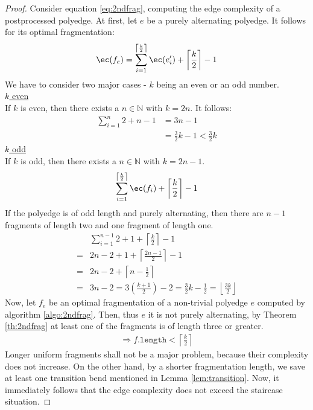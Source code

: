 \begin{proof}
	Consider equation \ref{eq:2ndfrag}, computing the edge complexity of a postprocessed polyedge. At first, let $e$ be a purely alternating polyedge. It follows for its optimal fragmentation:
	\begin{align*}
	\ec(f_e) = \sum_{i=1}^{\left\lceil\frac{k}{2}\right\rceil} \ec(e'_i) + \left\lceil\frac{k}{2}\right\rceil - 1
	\end{align*}
	We have to consider two major cases - $k$ being an even or an odd number.\\
	\underline{$k$ even}\\
	If $k$ is even, then there exists a $n \in \mathbb{N}$ with $k = 2n$. It follows:
	\begin{align*}
	\sum_{i=1}^{n} 2 + n - 1 &= 3n - 1\\
	&= \frac{3}{2}k - 1 < \frac{3}{2}k
	\end{align*}
	\underline{$k$ odd}\\
	If $k$ is odd, then there exists a $n \in \mathbb{N}$ with $k = 2n-1$.
	\begin{align*}
	\sum_{i=1}^{\left\lceil\frac{k}{2}\right\rceil} \ec(f_i) + \left\lceil\frac{k}{2}\right\rceil - 1
	\end{align*}
	If the polyedge is of odd length and purely alternating, then there are $n-1$ fragments of length two and one fragment of length one.
	\begin{align*}
	&\sum_{i=1}^{n-1} 2 + 1 + \left\lceil\frac{k}{2}\right\rceil - 1\\
	= &2n - 2 + 1 + \left\lceil\frac{2n-1}{2}\right\rceil - 1\\
	= &2n - 2 + \left\lceil n-\frac{1}{2}\right\rceil\\
	= &3n-2 = 3\left(\frac{k+1}{2}\right) - 2 = \frac{3}{2}k - \frac{1}{2} = \left\lfloor\frac{3k}{2}\right\rfloor
	\end{align*}
	Now, let $f_e$ be an optimal fragmentation of a non-trivial polyedge $e$ computed by algorithm \ref{algo:2ndfrag}. Then, thus $e$ it is not purely alternating, by Theorem \ref{th:2ndfrag} at least one of the fragments is of length three or greater. 
	\begin{align*}
	\Rightarrow f\texttt{.length} < \left\lceil\frac{k}{2}\right\rceil
	\end{align*}
	Longer uniform fragments shall not be a major problem, because their complexity does not increase. On the other hand, by a shorter fragmentation length, we save at least one transition bend mentioned in Lemma \ref{lem:transition}. Now, it immediately follows that the edge complexity does not exceed the staircase situation.
\end{proof}
